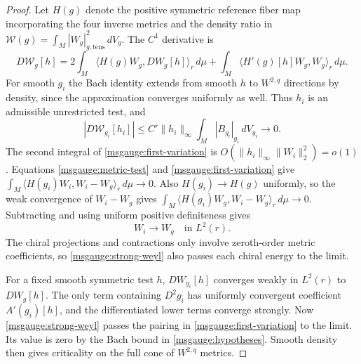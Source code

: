 \documentclass[11pt]{article}
\numberwithin{equation}{section}
\theoremstyle{definition}
\theoremstyle{remark}
\begin{document}
\begin{proof}
Let \(H(g)\) denote the positive symmetric reference fiber map
incorporating the four inverse metrics and the density ratio
in \(\mathcal W(g)=\int_M |W_g|_{g,\mathrm{tens}}^2\,dV_g\).
The \(C^1\) derivative is
\begin{equation}\label{msgauge:first-variation}
 D\mathcal W_g[h]
  =2\int_M\langle H(g)W_g,DW_g[h]\rangle_r\,d\mu
    +\int_M\langle H'(g)[h]W_g,W_g\rangle_r\,d\mu .
\end{equation}
For smooth \(g_i\) the Bach identity extends from smooth \(h\) to
\(W^{2,q}\) directions by density, since the approximation converges
uniformly as well. Thus \(h_i\) is an admissible unrestricted test, and
\[
 |D\mathcal W_{g_i}[h_i]|
     \le C'\|h_i\|_\infty\int_M|B_{g_i}|_{g_i}\,dV_{g_i}\longrightarrow0 .
\]
The second integral of \eqref{msgauge:first-variation} is
\(O(\|h_i\|_\infty\|W_i\|_2^2)=o(1)\). Equations
\eqref{msgauge:metric-test} and \eqref{msgauge:first-variation} give
\(\int_M\langle H(g_i)W_i,W_i-W_g\rangle_r\,d\mu\to0\).
Also \(H(g_i)\to H(g)\) uniformly, so the weak convergence of
\(W_i-W_g\) gives
\(\int_M\langle H(g_i)W_g,W_i-W_g\rangle_r\,d\mu\to0\).
Subtracting and using uniform positive definiteness gives
\begin{equation}\label{msgauge:strong-weyl}
 W_i\longrightarrow W_g\quad\text{in }L^2(r).
\end{equation}
The chiral projections and contractions only involve zeroth-order
metric coefficients, so \eqref{msgauge:strong-weyl} also passes
each chiral energy to the limit.

For a fixed smooth symmetric test \(h\), \(DW_{g_i}[h]\)
converges weakly in \(L^2(r)\) to \(DW_g[h]\). The only term
containing \(D^2g_i\) has uniformly convergent coefficient
\(A'(g_i)[h]\), and the differentiated lower terms converge
strongly. Now \eqref{msgauge:strong-weyl} passes the pairing in
\eqref{msgauge:first-variation} to the limit. Its value is zero
by the Bach bound in \eqref{msgauge:hypotheses}. Smooth density
then gives criticality on the full cone of \(W^{2,q}\) metrics.


\end{proof}
\end{document}
